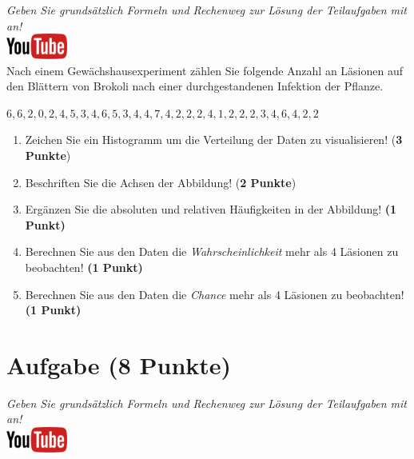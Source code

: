 \documentclass[a4paper, 9pt]{scrartcl}\usepackage[]{graphicx}\usepackage[]{xcolor}
\begin{document}
\textit{Geben Sie grunds{\"a}tzlich Formeln und Rechenweg zur L{\"o}sung der
  Teilaufgaben mit an!} \\[1Ex]

\hfill\href{https://youtu.be/aXvxGC4YLqk}{\includegraphics[width =
  2cm]{img/youtube}}\\[1Ex]



Nach einem Gew{\"a}chshausexperiment z{\"a}hlen Sie folgende Anzahl an L{\"a}sionen auf den
Bl{\"a}ttern von Brokoli nach einer durchgestandenen Infektion der Pflanze. 

\begin{center}
$6, 6, 2, 0, 2, 4, 5, 3, 4, 6, 5, 3, 4, 4, 7, 4, 2, 2, 2, 4, 1, 2, 2, 2, 3, 4, 6, 4, 2, 2$
\end{center}

\begin{enumerate}
\item Zeichen Sie ein Histogramm um die Verteilung der Daten zu visualisieren! (\textbf{3 Punkte})
\item Beschriften Sie die Achsen der Abbildung! (\textbf{2 Punkte})
\item Erg{\"a}nzen Sie die absoluten und relativen H{\"a}ufigkeiten in der
  Abbildung! \textbf{(1 Punkt)}
\item Berechnen Sie aus den Daten die \textit{Wahrscheinlichkeit}
  mehr als 4 L{\"a}sionen zu beobachten! \textbf{(1
    Punkt)}
\item Berechnen Sie aus den Daten die \textit{Chance} mehr
  als 4 L{\"a}sionen zu beobachten! \textbf{(1 Punkt)}
\end{enumerate}

 
\clearpage

\section{Aufgabe \hfill (8 Punkte)}

\textit{Geben Sie grunds{\"a}tzlich Formeln und Rechenweg zur L{\"o}sung der
  Teilaufgaben mit an!} \\[1Ex]

\hfill\href{https://youtu.be/ORHSPTCdfeY}{\includegraphics[width =
  2cm]{img/youtube}}\\[1Ex]
\end{document}
